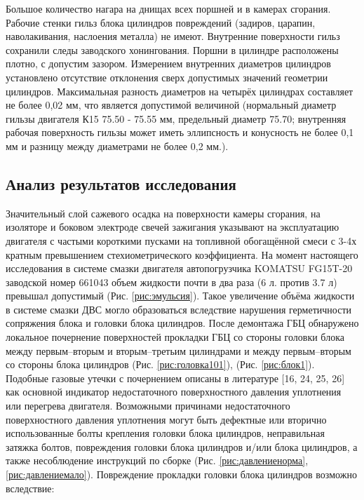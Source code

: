 Большое количество нагара на днищах всех поршней и в камерах сгорания. 
Рабочие стенки гильз блока цилиндров повреждений (задиров, царапин, наволакивания, наслоения металла) не имеют. Внутренние поверхности гильз сохранили следы заводского хонингования. Поршни в цилиндре расположены плотно,  с допустим зазором.  Измерением внутренних диаметров цилиндров установлено отсутствие отклонения сверх допустимых значений геометрии  цилиндров.  Максимальная разность диаметров на четырёх цилиндрах составляет не более 0,02 мм, что является допустимой величиной (нормальный диаметр гильзы двигателя К15  75.50 - 75.55 мм, предельный диаметр 75.70; внутренняя рабочая поверхность  гильзы может иметь эллипсность и конусность не более 0,1 мм и разницу между диаметрами не более 0,2 мм.).


\subsection{Анализ результатов исследования}

Значительный слой сажевого осадка на поверхности камеры сгорания, на изоляторе и боковом электроде свечей зажигания указывают на эксплуатацию двигателя  с частыми короткими пусками на топливной обогащённой смеси с 3-4х  кратным превышением стехиометрического коэффициента. На момент настоящего исследования  в системе смазки двигателя автопогрузчика KOMATSU FG15T-20 заводской номер 661043  объем жидкости почти в два раза (6 л. против 3.7 л) превышал допустимый (Рис. \ref{рис:эмульсия}).  Такое увеличение объёма жидкости в системе смазки ДВС могло образоваться вследствие нарушения герметичности сопряжения блока и головки блока цилиндров.    После демонтажа ГБЦ  обнаружено  локальное почернение  поверхностей прокладки ГБЦ со стороны головки блока между первым--вторым и вторым--третьим  цилиндрами и между первым--вторым со стороны блока цилиндров (Рис. \ref{рис:головка101}), (Рис. \ref{рис:блок1}). Подобные газовые утечки с почернением  описаны в литературе [16, 24, 25, 26] как основной индикатор недостаточного поверхностного давления  уплотнения или перегрева двигателя.  Возможными причинами недостаточного поверхностного давления уплотнения могут быть дефектные или вторично использованные болты крепления головки блока цилиндров, неправильная затяжка болтов, повреждения головки блока цилиндров и/или блока цилиндров, а также несоблюдение инструкций по сборке (Рис. \ref{рис:давлениенорма}, \ref{рис:давлениемало}).
Повреждение прокладки головки блока цилиндров возможно вследствие:

